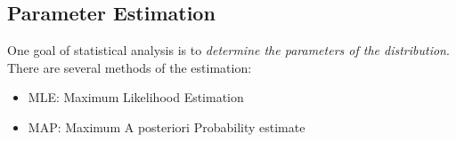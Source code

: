 \documentclass[../main.tex]{subfiles}
\begin{document}
\subsection{Parameter Estimation}
One goal of statistical analysis is to \emph{determine the parameters of the distribution}.
There are several methods of the estimation:
\begin{itemize}
    \item MLE: Maximum Likelihood Estimation
    \item MAP: Maximum A posteriori Probability estimate
\end{itemize}
\end{document}
